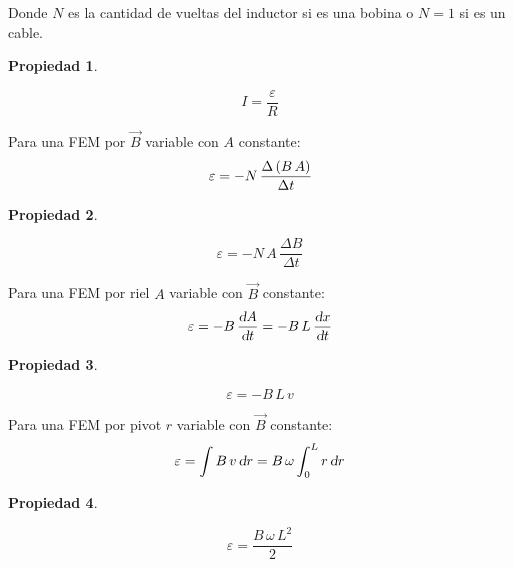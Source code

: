 \documentclass[a5paper,12pt,twoside]{book}
\newtheorem{prop}{{Propiedad}}[chapter]
\begin{document}
Donde $N$ es la cantidad de vueltas del inductor si es una bobina o $N=1$ si es un cable.

\begin{mdframed}[style=MyFrame1]
    \begin{prop}
    \end{prop}
    \begin{equation*}
        I = \frac{\varepsilon}{R}
    \end{equation*}
\end{mdframed}

Para una FEM por $\Vec{B}$ variable con $A$ constante:
\begin{equation*}
    \varepsilon = - N \, \frac{\Delta \left(B \, A\right)}{\Delta t}
\end{equation*}

\begin{mdframed}[style=MyFrame1]
    \begin{prop}
    \end{prop}
    \begin{equation*}
        \varepsilon = - N \, A \, \frac{\Delta B}{\Delta t}
    \end{equation*}
\end{mdframed}

Para una FEM por riel $A$ variable con $\Vec{B}$ constante:
\begin{equation*}
    \varepsilon = - B \, \frac{\textsl{d} A}{\textsl{d} t} = - B \, L \, \frac{\textsl{d} x}{\textsl{d} t}
\end{equation*}

\begin{mdframed}[style=MyFrame1]
    \begin{prop}
    \end{prop}
    \begin{equation*}
        \varepsilon = - B \, L \, v
    \end{equation*}
\end{mdframed}

Para una FEM por pivot $r$ variable con $\Vec{B}$ constante:
\begin{equation*}
    \varepsilon = \int B \, v \, \textsl{d} r = B \, \omega \int_0^L r \, \textsl{d} r
\end{equation*}

\begin{mdframed}[style=MyFrame1]
    \begin{prop}
    \end{prop}
    \begin{equation*}
        \varepsilon = \frac{B \, \omega \, L^2}{2}
    \end{equation*}
\end{mdframed}
\end{document}
